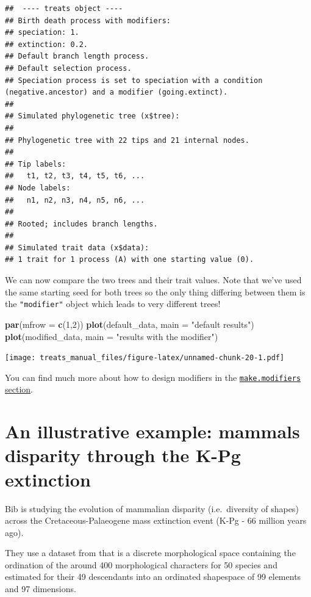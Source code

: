 \documentclass[
]{book}
\newenvironment{Shaded}{\begin{snugshade}}{\end{snugshade}}
\newcommand{\DataTypeTok}[1]{\textcolor[rgb]{0.13,0.29,0.53}{#1}}
\newcommand{\DecValTok}[1]{\textcolor[rgb]{0.00,0.00,0.81}{#1}}
\newcommand{\KeywordTok}[1]{\textcolor[rgb]{0.13,0.29,0.53}{\textbf{#1}}}
\newcommand{\NormalTok}[1]{#1}
\newcommand{\StringTok}[1]{\textcolor[rgb]{0.31,0.60,0.02}{#1}}
\begin{document}
\begin{verbatim}
##  ---- treats object ---- 
## Birth death process with modifiers:
## speciation: 1.
## extinction: 0.2.
## Default branch length process.
## Default selection process.
## Speciation process is set to speciation with a condition (negative.ancestor) and a modifier (going.extinct).
## 
## Simulated phylogenetic tree (x$tree):
## 
## Phylogenetic tree with 22 tips and 21 internal nodes.
## 
## Tip labels:
##   t1, t2, t3, t4, t5, t6, ...
## Node labels:
##   n1, n2, n3, n4, n5, n6, ...
## 
## Rooted; includes branch lengths.
## 
## Simulated trait data (x$data):
## 1 trait for 1 process (A) with one starting value (0).
\end{verbatim}

We can now compare the two trees and their trait values.
Note that we've used the same starting seed for both trees so the only thing differing between them is the \texttt{"modifier"} object which leads to very different trees!

\begin{Shaded}
\begin{Highlighting}[]
\KeywordTok{par}\NormalTok{(}\DataTypeTok{mfrow =} \KeywordTok{c}\NormalTok{(}\DecValTok{1}\NormalTok{,}\DecValTok{2}\NormalTok{))}
\KeywordTok{plot}\NormalTok{(default\_data, }\DataTypeTok{main =} \StringTok{"default results"}\NormalTok{)}
\KeywordTok{plot}\NormalTok{(modified\_data, }\DataTypeTok{main =} \StringTok{"results with the modifier"}\NormalTok{)}
\end{Highlighting}
\end{Shaded}

\texttt{[image: treats\_manual\_files/figure-latex/unnamed-chunk-20-1.pdf]}

You can find much more about how to design modifiers in the \protect\hyperlink{makemodifiers}{\texttt{make.modifiers} section}.

\hypertarget{kpgexample}{%
\section{An illustrative example: mammals disparity through the K-Pg extinction}\label{kpgexample}}

Bib is studying the evolution of mammalian disparity (i.e.~diversity of shapes) across the Cretaceous-Palaeogene mass extinction event (K-Pg - 66 million years ago).

They use a dataset from \citet{beckancient2014} that is a discrete morphological space containing the ordination of the around 400 morphological characters for 50 species and estimated for their 49 descendants into an ordinated shapespace of 99 elements and 97 dimensions.
\end{document}
